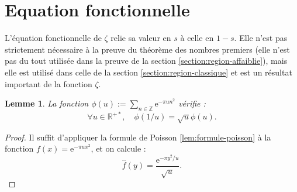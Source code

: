 \documentclass[french]{report}
\newtheorem{proposition}[theorem]{Proposition}
\newtheorem{lemma}[theorem]{Lemme}
\begin{document}



\section{Equation fonctionnelle}

L'équation fonctionnelle de $\zeta$ relie sa valeur en $s$ à celle en $1-s$. Elle n'est pas strictement nécessaire à la preuve du théorème des nombres premiers (elle n'est pas du tout utilisée dans la preuve de la section \ref{section:region-affaiblie}), mais elle est utilisé dans celle de la section \ref{section:region-classique} et est un résultat important de la fonction $\zeta$.

\begin{lemma}
  La fonction $\phi(u):=\sum_{n\in\mathbb{Z}}\mathrm{e}^{-\pi un^2}$ vérifie :
  \[
    \forall u\in\mathbb{R}^{+*},\quad
    \phi(1/u)=\sqrt{u}\phi(u).
  \]
\end{lemma}

\begin{proof}
  Il suffit d'appliquer la formule de Poisson \ref{lem:formule-poisson} à la fonction $f(x)=\mathrm{e}^{-\pi ux^2}$, et on calcule :
  \[
    \hat{f}(y) = \frac{\mathrm{e}^{-\pi y^2/u}}{\sqrt{u}}.
  \]
\end{proof}
\end{document}
